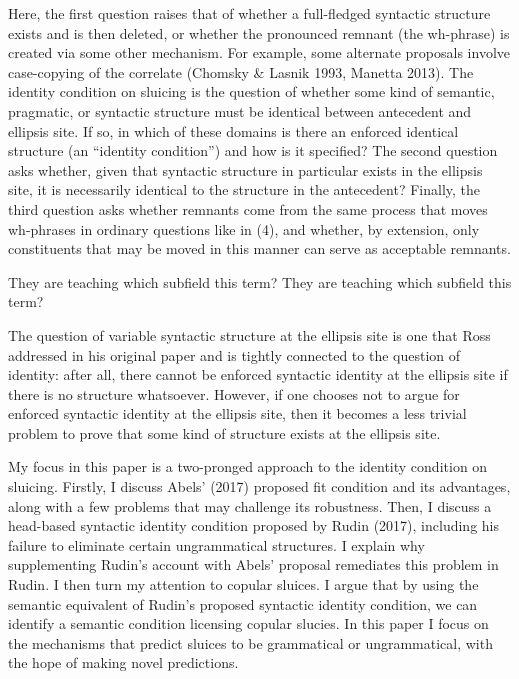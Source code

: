 \documentclass{turabian-researchpaper}
\begin{document}
\noindent Here, the first question raises that of whether a full-fledged syntactic structure exists and is then deleted, or whether the pronounced remnant (the wh-phrase) is created via some other mechanism. For example, some alternate proposals involve case-copying of the correlate (Chomsky \& Lasnik 1993, Manetta 2013). 
The identity condition on sluicing is the question of whether some kind of semantic, pragmatic, or syntactic structure must be identical between antecedent and ellipsis site. If so, in which of these domains is there an enforced identical structure (an ``identity condition'') and how is it specified?  The second question asks whether, given that syntactic structure in particular exists in the ellipsis site, it is necessarily identical to the structure in the antecedent? Finally, the third question asks whether remnants come from the same process that moves wh-phrases in ordinary questions like in (4), and whether, by extension, only constituents that may be moved in this manner can serve as acceptable remnants.  

\begin{exe}
\ex\label{whichsubfield}
\begin{xlist}
\ex They are teaching which subfield this term? 
\ex They are teaching which subfield this term? 
\end{xlist}
\end{exe}

The question of variable syntactic structure at the ellipsis site is one that Ross addressed in his original paper and is tightly connected to the question of identity: after all, there cannot be enforced syntactic identity at the ellipsis site if there is no structure whatsoever. However, if one chooses not to argue for enforced syntactic identity at the ellipsis site, then it becomes a less trivial problem to prove that some kind of structure exists at the ellipsis site. 

My focus in this paper is a two-pronged approach to the identity condition on sluicing. 
Firstly, I discuss Abels' (2017) proposed fit condition and its advantages, along with a few problems that may challenge its robustness. Then, I discuss a head-based syntactic identity condition proposed by Rudin (2017), including his failure to eliminate certain ungrammatical structures. I explain why supplementing Rudin's account with Abels' proposal remediates this problem in Rudin. I then turn my attention to copular sluices. I argue that by using the semantic equivalent of Rudin's proposed syntactic identity condition, we can identify a semantic condition licensing copular slucies. In this paper I focus on the mechanisms that predict sluices to be grammatical or ungrammatical, with the hope of making novel predictions.  
\end{document}
